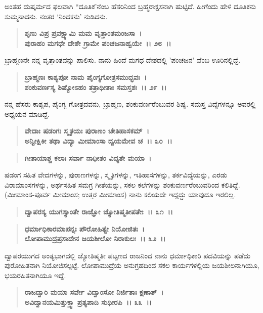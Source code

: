 ಅಂತಹ ದುಷ್ಕರ್ಮದ ಫಲವಾಗಿ “ದೂತಿಕ'ನೆಂಬ ಹೆಸರಿನಿಂದ ಬ್ರಹ್ಮರಾಕ್ಷಸನಾಗಿ ಹುಟ್ಟಿದೆ. ಹೀಗೆಂದು ಹೇಳಿ ದೂತಿಕನು ಸುಮ್ಮನಾದನು. ನಂತರ `ನಿಂದಕನು' ನುಡಿದನು.

\begin{verse}
\textbf{ಶೃಣು ವಿಪ್ರ ಪ್ರವಕ್ಷ್ಯಾಮಿ ಮಮ ವೃತ್ತಾಂತಮಂಜಸಾ~।}\\\textbf{ಪುರಾಹಂ ಮಗಧೇ ದೇಶೇ ಗ್ರಾಮೇ ಪಂಚಜನಾಹ್ವಯೇ~।। ೨೮~।।}
\end{verse}

ಬ್ರಾಹ್ಮಣನೇ ನನ್ನ ವೃತ್ತಾಂತವನ್ನು ಪಾಲಿಸು. ನಾನು ಹಿಂದೆ ಮಗಧ ದೇಶದಲ್ಲಿ 'ಪಂಚಜನ' ವೆಂಬ ಊರಿನಲ್ಲಿದ್ದೆ.

\begin{verse}
\textbf{ಬ್ರಾಹ್ಮಣಃ ಕಾಶ್ಯಪೋ ನಾಮ ಪೈಂಗ್ಯಗೋತ್ರಸಮುದ್ಭವಃ~।}\\\textbf{ಶಂಕುವರ್ಣಸ್ಯ ಶಿಷ್ಯೋಽಹಂ ತತ್ರಾಧೀತಾಃ ಸಮಸ್ತಶಃ~।। ೨೯~।।}
\end{verse}

ನನ್ನ ಹೆಸರು ಕಾಶ್ಯಪ, ಪೈಂಗ್ಯ ಗೋತ್ರದವನು, ಬ್ರಾಹ್ಮಣ, ಶಂಕುವರ್ಣರೆಂಬುವರ ಶಿಷ್ಯ. ಸಮಸ್ತ ವಿದ್ಯೆಗಳನ್ನೂ ಅವರಲ್ಲಿ ಅಧ್ಯಯನ ಮಾಡಿದ್ದೆ.

\begin{verse}
\textbf{ವೇದಾಃ ಷಡಂಗಃ ಸ್ಮೃತಯಃ ಪುರಾಣಂ ಚೇತಿಹಾಸಕಮ್~।}\\\textbf{ಅನ್ವೀಕ್ಷಿಕೀ ತಥಾ ವಿದ್ಯಾ ಮೀಮಾಂಸಾ ದ್ವಯಮೇವ ಚ~।। ೩೦~।।}
\end{verse}

\begin{verse}
\textbf{ಗೀತಾಯಾಶ್ಚ ಕಲಾಃ ಸರ್ವಾ ನಾಧೀತಂ ವಿದ್ಯತೇ ಮಯಾ~।}
\end{verse}

ಷಡಂಗ ಸಹಿತ ವೇದಗಳನ್ನು, ಪುರಾಣಗಳನ್ನು, ಸ್ಮೃತಿಗಳನ್ನು, ಇತಿಹಾಸಗಳನ್ನು, ತರ್ಕವಿದ್ಯೆಯನ್ನು, ಎರಡು ವಿರಾಮಾಂಸಗಳನ್ನು, ಅರ್ಥಸಹಿತ ಸಮಗ್ರ ಗೀತೆಯನ್ನು, ಸಕಲ ಕಲೆಗಳನ್ನು ಶಂಕುವರ್ಣರೆಂಬುವರಿಂದ ಕಲಿತಿದ್ದೆ. (ಮೀಮಾಂಸ-ಪೂರ್ವ ಮೀಮಾಂಸ; ಉತ್ತರ ಮೀಮಾಂಸ) ನಾನು ಕಲಿಯದೇ ಇದ್ದದ್ದು ಯಾವುದೂ ಇರಲಿಲ್ಲ.

\begin{verse}
\textbf{ದ್ವಾಪರಸ್ಯ ಯುಗಸ್ಯಾಂತೇ ರಾಜ್ಞೋ ಜ್ಯೋತಿಷ್ಮತೀಪತೇಃ~।। ೩೧~।।}
\end{verse}

\begin{verse}
\textbf{ಧರ್ಮಾಧಿಕಾರಮಾಪನ್ನಃ ಪೌರೋಹಿತ್ಯೇ ನಿಯೋಜಿತಃ~।}\\\textbf{ಲೋಪಾಮುದ್ರಪ್ರಸಾದೇನ ಜಯಶೀಲೋ ನಿರಾಕುಲಃ~।। ೩೨~।।}
\end{verse}

ದ್ವಾಪರಯುಗದ ಅಂತ್ಯಭಾಗದಲ್ಲಿ ಜ್ಯೋತಿಷ್ಮತೀ ಪಟ್ಟಣದ ರಾಜನಿಂದ ನಾನು ಧರ್ಮಾಧಿ\-ಕಾರಿ ಪದವಿಯನ್ನು ಪಡೆದು ಪುರೋಹಿತನಾಗಿ ನಿಯೋಜಿಸಲ್ಪಟ್ಟೆ. ಲೋಪಾಮುದ್ರೆಯ ಅನುಗ್ರಹದಿಂದ ಸಕಲ ಕಾರ್ಯಗಳಲ್ಲಿಯ ಜಯಶೀಲನಾಗಿಯೂ, ಭಯರಹಿತನಾಗಿಯೂ ಇದ್ದೆ.

\begin{verse}
\textbf{ರಾಜದ್ವಾರಿ ಮಯಾ ಸರ್ವೇ ವಿದ್ವಾಂಸೋ ನಿರ್ಜಿತಾಃ ಕ್ಷಣಾತ್~।}\\\textbf{ಅವಿದ್ವಾನಯಮಿತ್ತುಕ್ತ್ವಾ ಪ್ರತ್ಯಪಾದಿ ಸುಧೀರಪಿ~।। ೩೩~।। }
\end{verse}

